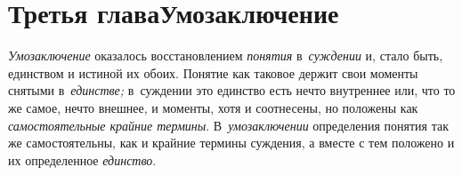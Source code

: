 \chapter[Третья глава Умозаключение]{Третья глава\newline Умозаключение}

{\em Умозаключение} оказалось восстановлением {\em понятия} в~{\em суждении}
и, стало быть, единством и истиной их обоих. Понятие как таковое держит свои
моменты снятыми в~{\em единстве;} в~суждении это единство есть нечто внутреннее
или, что то же самое, нечто внешнее, и моменты, хотя и соотнесены, но положены
как {\em самостоятельные крайние термины}. В~{\em умозаключении} определения
понятия так же самостоятельны, как и крайние термины суждения, а вместе с тем
положено и их определенное {\em единство}.

